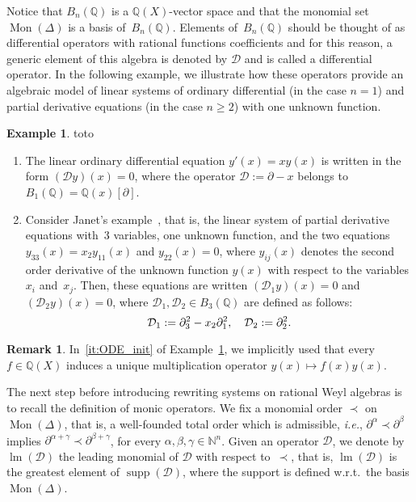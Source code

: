 \documentclass[10pt]{easychair}
\theoremstyle{definition}
\newtheorem{remark}[theorem]{Remark}
\newtheorem{example}[theorem]{Example}
\newcommand\ie{\emph{i.e.}}
\DeclareMathOperator{\supp}{supp}
\newcommand\D{\mathcal{D}}
\DeclareMathOperator{\lm}{lm}
\newcommand\Q{\mathbb{Q}}
\newcommand\N{\mathbb{N}}
\newcommand\Weyl[1]{B_{#1}(\Q)}
\newcommand\monBasis{\Mon(\Delta)}
\DeclareMathOperator{\Mon}{Mon}
\begin{document}
Notice that $\Weyl{n}$ is a $\Q(X)$-vector space and that the monomial 
set $\monBasis$ is a basis of~$\Weyl{n}$. Elements of~$\Weyl{n}$ should 
be thought of as differential operators with rational functions 
coefficients and for this reason, a generic element of this algebra is
denoted by $\D$ and is called a differential operator. In the following
example, we illustrate how these operators provide an algebraic model of
linear systems of ordinary differential (in the case $n=1$) and partial
derivative equations (in the case $n\geq 2$) with one unknown function. 
\smallskip

\begin{example}\label{ex:diff_operators_init}
  {\color{white}toto}
  \begin{enumerate}
  \item\label{it:ODE_init} The linear ordinary differential equation
    $y'(x)=xy(x)$ is written in the form $(\D y)(x)=0$, where the operator
    $\D:=\partial-x$ belongs to $\Weyl{1}=\Q(x)[\partial]$. 
  \item\label{it:Janet_example_init} Consider Janet's
    example~\cite{MR1308976}, that is, the linear system of partial
    derivative equations with~$3$ variables, one unknown function, and
    the two equations $y_{33}(x)=x_2y_{11}(x)$ and $y_{22}(x)=0$, where
    $y_{ij}(x)$ denotes the second order derivative of the unknown
    function $y(x)$ with respect to the variables $x_i$ and~$x_j$. Then,
    these equations are written $(\D_1y)(x)=0$ and $(\D_2y)(x)=0$, where
    $\D_1,\D_2\in\Weyl{3}$ are defined as follows:
    \[\D_1:=\partial_3^2-x_2\partial_1^2,\quad \D_2:=\partial_2^2.
    \smallskip\]
  \end{enumerate}
\end{example}

\begin{remark}
  In~\ref{it:ODE_init} of Example~\ref{ex:diff_operators_init}, we
  implicitly used that every $f\in\Q(X)$ induces a unique multiplication
  operator $y(x)\mapsto f(x)y(x)$.
\end{remark}
\smallskip

The next step before introducing rewriting systems on rational Weyl
algebras is to recall the definition of monic operators. We fix a
monomial order $\prec$ on $\monBasis$, that is, a well-founded total 
order which is admissible, \ie, $\partial^{\alpha}\prec\partial^{\beta}$
implies $\partial^{\alpha+\gamma}\prec\partial^{\beta+\gamma}$, for every
$\alpha,\beta,\gamma\in\N^n$. Given an operator $\D$, we denote by
$\lm(\D)$ the leading monomial of $\D$ with respect to~$\prec$, that 
is, $\lm(\D)$ is the greatest element of $\supp(\D)$, where the support 
is defined w.r.t.\ the basis $\monBasis$. 
\smallskip
\end{document}
